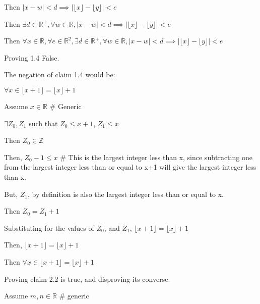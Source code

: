 \documentclass{article}
\newcommand{\floor}[1]{\lfloor #1\rfloor}
\begin{document}
\begin{enumerate}
\begin{description}
\begin{description}
\begin{description}
            \item Then $\mid x - w \mid < d \implies \mid \floor{x} - \floor{y} \mid < e$
            \end{description}
        \item Then $\exists d \in \mathbb{R}^+, \forall w \in \mathbb{R}, \mid x - w \mid < d \implies \mid \floor{x} - \floor{y} \mid < e$
        \end{description}
    \item Then $\forall x \in \mathbb{R}, \forall e \in \mathbb{R}^2, \exists d \in \mathbb{R}^+, \forall w \in \mathbb{R}, \mid x - w \mid < d \implies \mid \floor{x} - \floor{y} \mid < e$
    \end{description}

\item Proving 1.4 False.
		\begin{description}
		\item The negation of claim 1.4 would be:
		\item $\forall x \in \floor{x+1} = \floor{x} + 1$
				\begin{description}
				\item Assume $x \in \mathbb{R}$ \# Generic
						\begin{description}
						\item $\exists Z_{0}, Z_1$ such that $Z_0 \leq x+1$, $Z_1 \leq x$
						\item Then $Z_0 \in \mathbb{Z}$
						\item Then, $Z_{0} - 1 \leq x$ \# This is the largest integer less than x, since subtracting one from the largest integer less than or equal to x+1 will give the largest integer less than x.
						\item But, $Z_1$, by definition is also the largest integer less than or equal to x.
						\item Then $Z_0 = Z_1 + 1$
						\item Substituting for the values of $Z_0$, and $Z_1$, $\floor{x+1} = \floor{x}+1$
						\end{description}
				\item Then, $\floor{x+1} = \floor{x}+1$
				\end{description}
		\item Then $\forall x \in \floor{x+1} = \floor{x} + 1$
		\end{description}
\item Proving claim 2.2 is true, and disproving its converse.
		\begin{description}
				\item Assume $m, n \in \mathbb{R}$ \# generic

\end{description}
\end{enumerate}
\end{document}
